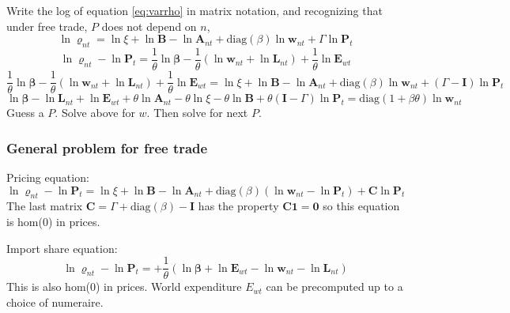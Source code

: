\documentclass[12pt]{article}
\begin{document}
Write the log of equation \eqref{eq:varrho} in matrix notation, and recognizing that under free trade, $P$ does not depend on $n$,
\[
\ln\mathbf \varrho_{nt} = \ln\xi
	+ \ln\mathbf B
	- \ln\mathbf A_{nt}
	+ \text{diag}(\beta) \ln\mathbf w_{nt}
	+ \Gamma \ln\mathbf P_{t}  
\]
\[
\ln\mathbf \varrho_{nt} - \ln\mathbf P_{t} 
 = \frac1\theta\ln\mathbf\beta
 	-\frac1\theta(\ln \mathbf w_{nt}+ \ln \mathbf L_{nt})
 	+\frac1\theta \ln \mathbf E_{wt}
\]
\[
\frac1\theta\ln\mathbf\beta
 	-\frac1\theta(\ln \mathbf w_{nt}+ \ln \mathbf L_{nt})
 	+\frac1\theta \ln \mathbf E_{wt}
=
\ln\xi
	+ \ln\mathbf B
	- \ln\mathbf A_{nt}
	+ \text{diag}(\beta) \ln\mathbf w_{nt}
	+ (\Gamma-\mathbf I) \ln\mathbf P_{t}
\]
\[
\ln\mathbf\beta
 	-\ln \mathbf L_{nt}
 	+ \ln \mathbf E_{wt}
	+ \theta\ln\mathbf A_{nt}
	-\theta\ln\xi
	- \theta\ln\mathbf B
	+ \theta(\mathbf I-\Gamma) \ln\mathbf P_{t}
=
	 \text{diag}(1+\beta\theta) \ln\mathbf w_{nt}
\]
Guess a $P$. Solve above for $w$. Then solve for next $P$.
\subsubsection{General problem for free trade}
Pricing equation:
\[
\ln\mathbf \varrho_{nt}-\ln\mathbf P_{t} = 
\ln\xi
	+ \ln\mathbf B
	- \ln\mathbf A_{nt}
+\text{diag}(\beta)(\ln\mathbf w_{nt}-\ln\mathbf P_{t})
+ \mathbf C \ln\mathbf P_{t}  
\]
The last matrix $\mathbf C = \Gamma+\text{diag}(\beta)-\mathbf I$ has the property $\mathbf C\mathbf 1=\mathbf 0$ so this equation is hom(0) in prices. 

Import share equation:
\[
\ln\mathbf \varrho_{nt} - \ln\mathbf P_{t} 
 = 
 	+\frac1\theta(\ln\mathbf\beta+\ln \mathbf E_{wt}-\ln \mathbf w_{nt}- \ln \mathbf L_{nt})
\]
This is also hom(0) in prices. World expenditure $E_{wt}$ can be precomputed up to a choice of numeraire.
\end{document}
